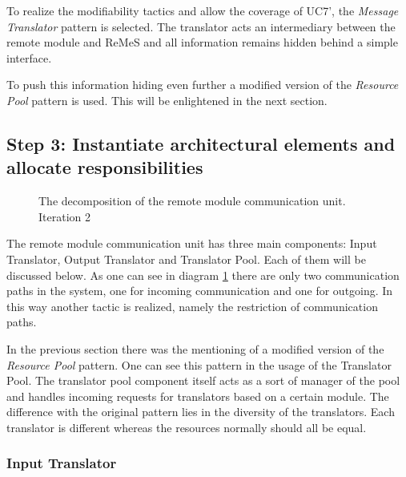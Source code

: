 \npar To realize the modifiability tactics and allow the coverage of UC7', the
\emph{Message Translator} pattern is selected. The translator acts an
intermediary between the remote module and ReMeS and all information remains
hidden behind a simple interface. 

\npar To push this information hiding even further a modified version of the
\emph{Resource Pool} pattern is used. This will be enlightened in the next
section.


\subsection{Step 3: Instantiate architectural elements and allocate responsibilities}
\label{add:it2/elements}

\begin{figure}[H]
	\begin{centering}
		\caption{The decomposition of the remote module communication unit. Iteration
		2}
		\label{fig:add/it2/decomposition}
	\end{centering}
\end{figure}

\npar The remote module communication unit has three main components: Input
Translator, Output Translator and Translator Pool. Each of them will be
discussed below. As one can see in diagram \ref{fig:add/it2/decomposition}
there are only two communication paths in the system, one for incoming
communication and one for outgoing. In this way another tactic is realized,
namely the restriction of communication paths.

\npar In the previous section there was the mentioning of a modified version of
the \emph{Resource Pool} pattern. One can see this pattern in the usage of the
Translator Pool. The translator pool component itself acts as a sort of manager
of the pool and handles incoming requests for translators based on a
certain module. The difference with the original pattern lies in the 
diversity of the translators. Each translator is different whereas the
resources normally should all be equal. 

\subsubsection{Input Translator}

